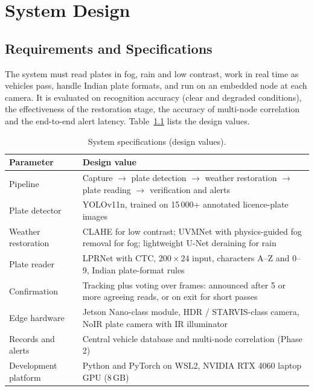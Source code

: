 \chapter{System Design}
\label{ch:design}

\section{Requirements and Specifications}

The system must read plates in fog, rain and low contrast, work in real time as
vehicles pass, handle Indian plate formats, and run on an embedded node at each
camera. It is evaluated on recognition accuracy (clear and degraded
conditions), the effectiveness of the restoration stage, the accuracy of
multi-node correlation and the end-to-end alert latency. Table~\ref{tab:specs}
lists the design values.

\begin{table}[t]
\centering
\caption{System specifications (design values).}
\label{tab:specs}
\small
\begin{tabularx}{\textwidth}{@{}lX@{}}
\toprule
\textbf{Parameter} & \textbf{Design value}\\
\midrule
Pipeline & Capture $\rightarrow$ plate detection $\rightarrow$ weather restoration $\rightarrow$ plate reading $\rightarrow$ verification and alerts\\
Plate detector & YOLOv11n, trained on 15\,000+ annotated licence-plate images\\
Weather restoration & CLAHE for low contrast; UVMNet with physics-guided fog removal for fog; lightweight U-Net deraining for rain\\
Plate reader & LPRNet with CTC, $200\times24$ input, characters A--Z and 0--9, Indian plate-format rules\\
Confirmation & Tracking plus voting over frames: announced after 5 or more agreeing reads, or on exit for short passes\\
Edge hardware & Jetson Nano-class module, HDR / STARVIS-class camera, NoIR plate camera with IR illuminator\\
Records and alerts & Central vehicle database and multi-node correlation (Phase 2)\\
Development platform & Python and PyTorch on WSL2, NVIDIA RTX 4060 laptop GPU (8\,GB)\\
\bottomrule
\end{tabularx}
\end{table}

